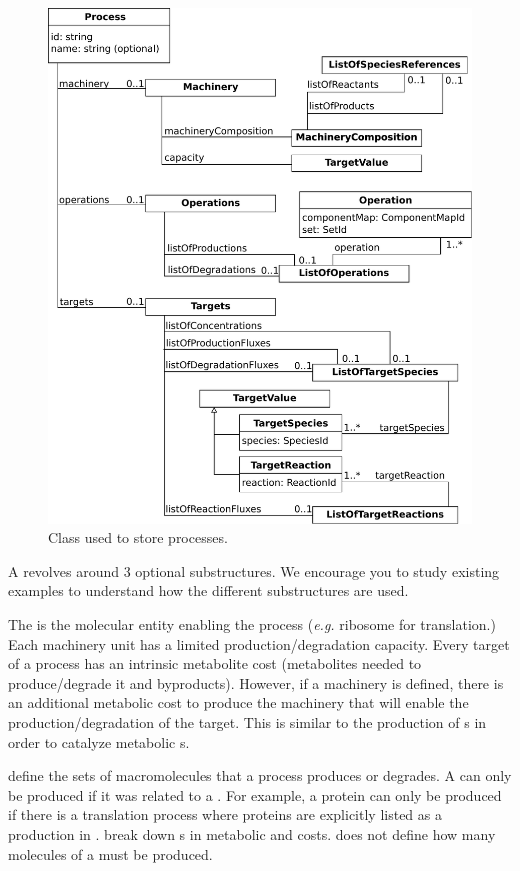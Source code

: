 \begin{figure}
  \centering
  \includegraphics[scale=0.8]{figures/processes_process}
  \caption{Class used to store processes.}
\label{fig:processes_process}
\end{figure}

A \process{} revolves around 3 optional substructures.
We encourage you to study existing examples to understand how the different
substructures are used.

The \machinery{} is the molecular entity enabling the process
(\textit{e.g.} ribosome for translation.)
Each machinery unit has a limited production/degradation capacity.
Every target of a process has an intrinsic metabolite cost
(metabolites needed to produce/degrade it and byproducts).
However, if a machinery is defined, there is an additional metabolic cost
to produce the machinery that will enable the production/degradation of the
target.
This is similar to the production of \enzyme{}s in order to catalyze
metabolic \reaction{}s.

\operations{} define the sets of macromolecules that a process
produces or degrades.
A \macromolecule{} can only be produced if it was related to a \process{}.
For example, a protein can only be produced if there is a translation process
where proteins are explicitly listed as a production in \operations{}.
\operations{} break down \macromolecule{}s in metabolic \species{}
and \machinery{} costs.
\operations{} does not define how many molecules of a \macromolecule{}
must be produced.

